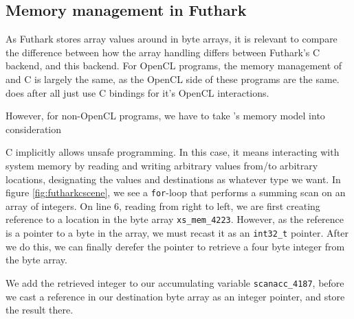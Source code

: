 \begin{description}
\section{Memory management in Futhark \csharp{}}
As Futhark stores array values around in byte arrays, it is relevant to compare
the difference between how the array handling differs between Futhark's C
backend, and this \csharp{} backend.
For OpenCL programs, the memory management of \csharp{} and C is largely the
same, as the OpenCL side of these programs are the same. \csharp{} does after
all just use C bindings for it's OpenCL interactions.

However, for non-OpenCL \csharp{} programs, we have to take \csharp{}'s memory
model into consideration

C implicitly allows unsafe programming. In this case, it means interacting with system
memory by reading and writing arbitrary values from/to arbitrary locations,
designating the values and destinations as whatever type we want.
In figure \ref{fig:futharkcscene}, we see a \texttt{for}-loop that
performs a summing scan on an array of integers.
On line 6, reading from right to left, we are first creating reference to
a location in the byte array \texttt{xs\_mem\_4223}. However, as the reference
is a pointer to a byte in the array, we must recast it as an \texttt{int32\_t} pointer.
After we do this, we can finally derefer the pointer to retrieve a four byte
integer from the byte array.

We add the retrieved integer to our accumulating variable
\texttt{scanacc\_4187}, before we cast a reference in our destination byte array
as an integer pointer, and store the result there.


\end{description}
